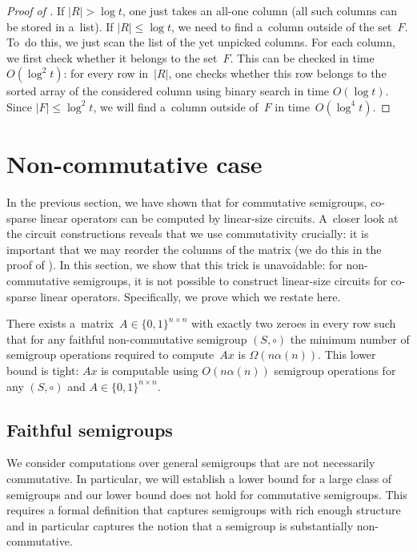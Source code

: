 \documentclass{toc}
\begin{document}
\begin{proof}[Proof of {}]
    If $|R| > \log t$, one just takes an all-one column (all such columns
    can be stored in a~list). If $|R| \le \log t$, we need to find a~column outside
    of the set~$F$. To~do this, we just scan the list of the yet unpicked columns. For
    each column, we first check whether it belongs to the set~$F$. This can be
    checked in time $O(\log^2t)$: for every row in~$|R|$, one checks whether this
    row belongs to the sorted array of the considered column using binary search in
    time $O(\log t)$. Since $|F| \le \log^2t$, we will find a~column outside of~$F$
    in time~$O(\log^4 t)$.

\end{proof}


\section{Non-commutative case}
\label{sec-non-commutative}

In the previous section, we have shown that for commutative semigroups,
%
%
%
co-sparse
linear operators can be computed by linear-size circuits. A~closer look at the
circuit constructions reveals that we use commutativity crucially: it is
important that we may reorder the columns of the matrix (we do this in the proof
of ). In this section, we show that this trick is
unavoidable: for non-commutative semigroups, it is not possible to construct
linear-size circuits for
%
%
co-sparse
linear operators. %
Specifically,  %
we prove 
which we restate here.  %


%
\begin{theorem}
    \label{thm:lowerbound}
    There exists
    a~matrix~$A \in \{0,1\}^{n \times n}$ with exactly two zeroes
    in every row such that for any faithful non-commutative semigroup $(S, \circ)$
    the minimum number of semigroup operations required to compute~$Ax$ is
    $\Omega(n\alpha(n))$.
    This lower bound is tight: $Ax$ is computable using $O(n\alpha(n))$ semigroup
    operations for any $(S, \circ)$ and $A\in \{0,1\}^{n \times n}$.
\end{theorem}

\subsection{Faithful semigroups}

We consider computations over general semigroups that are not necessarily
commutative. In particular, we will establish a lower bound for a large class of
semigroups and our lower bound does not hold for commutative semigroups. This
requires a formal definition that captures semigroups with rich enough structure
and in particular %
%
captures the notion   %
that a semigroup is substantially non-commutative.
\end{document}
